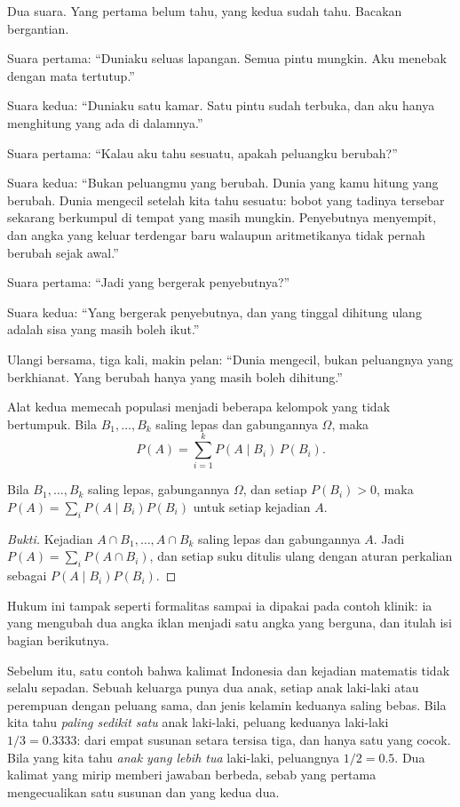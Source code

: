 \begin{bacakeras}
Dua suara. Yang pertama belum tahu, yang kedua sudah tahu. Bacakan bergantian.

Suara pertama: ``Duniaku seluas lapangan. Semua pintu mungkin. Aku menebak dengan mata
tertutup.''

Suara kedua: ``Duniaku satu kamar. Satu pintu sudah terbuka, dan aku hanya menghitung
yang ada di dalamnya.''

Suara pertama: ``Kalau aku tahu sesuatu, apakah peluangku berubah?''

Suara kedua: ``Bukan peluangmu yang berubah. Dunia yang kamu hitung yang berubah. Dunia
mengecil setelah kita tahu sesuatu: bobot yang tadinya tersebar sekarang berkumpul di
tempat yang masih mungkin. Penyebutnya menyempit, dan angka yang keluar terdengar baru
walaupun aritmetikanya tidak pernah berubah sejak awal.''

Suara pertama: ``Jadi yang bergerak penyebutnya?''

Suara kedua: ``Yang bergerak penyebutnya, dan yang tinggal dihitung ulang adalah sisa
yang masih boleh ikut.''

Ulangi bersama, tiga kali, makin pelan: ``Dunia mengecil, bukan peluangnya yang
berkhianat. Yang berubah hanya yang masih boleh dihitung.''
\end{bacakeras}

Alat kedua memecah populasi menjadi beberapa kelompok yang tidak bertumpuk. Bila
$B_{1},\dots,B_{k}$ saling lepas dan gabungannya $\Omega$, maka
\[
P(A)=\sum_{i=1}^{k}P(A\mid B_{i})\,P(B_{i}).
\]

\begin{proposisi}
Bila $B_{1},\dots,B_{k}$ saling lepas, gabungannya $\Omega$, dan setiap $P(B_{i})>0$,
maka $P(A)=\sum_{i}P(A\mid B_{i})P(B_{i})$ untuk setiap kejadian $A$.
\end{proposisi}

\begin{proof}[Bukti]
Kejadian $A\cap B_{1},\dots,A\cap B_{k}$ saling lepas dan gabungannya $A$. Jadi
$P(A)=\sum_{i}P(A\cap B_{i})$, dan setiap suku ditulis ulang dengan aturan perkalian
sebagai $P(A\mid B_{i})P(B_{i})$.
\end{proof}

Hukum ini tampak seperti formalitas sampai ia dipakai pada contoh klinik: ia yang
mengubah dua angka iklan menjadi satu angka yang berguna, dan itulah isi bagian
berikutnya.

Sebelum itu, satu contoh bahwa kalimat Indonesia dan kejadian matematis tidak selalu
sepadan. Sebuah keluarga punya dua anak, setiap anak laki-laki atau perempuan dengan
peluang sama, dan jenis kelamin keduanya saling bebas. Bila kita tahu \emph{paling sedikit
satu} anak laki-laki, peluang keduanya laki-laki $1/3=0.3333$: dari empat susunan setara
tersisa tiga, dan hanya satu yang cocok. Bila yang kita tahu \emph{anak yang lebih tua}
laki-laki, peluangnya $1/2=0.5$. Dua kalimat yang mirip memberi jawaban berbeda, sebab
yang pertama mengecualikan satu susunan dan yang kedua dua.

